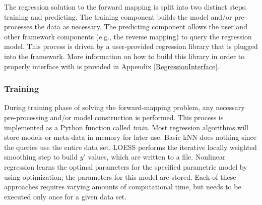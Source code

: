 The \fw regression solution to the forward mapping is split into two distinct steps: training and predicting.
The training component builds the model and/or pre-processes the data as necessary.
The predicting component allows the user and other framework components (e.g., the reverse mapping) to query the regression model.
This process is driven by a user-provided regression library that is plugged into the framework.
More information on how to build this library in order to properly interface with \fw is provided in Appendix \ref{RegressionInterface}.

\subsubsection{Training}

During training phase of solving the forward-mapping problem, any necessary pre-processing and/or model construction is performed.
This process is implemented as a Python function called \textit{train}.
Most regression algorithms will store models or meta-data in memory for later use.
Basic kNN does nothing since the queries use the entire data set.
LOESS performs the iterative locally weighted smoothing step to build $y'$ values, which are
written to a file.
Nonlinear regression learns the optimal parameters for the specified parametric model by using optimization; the parameters for this model are stored.
Each of these approaches requires varying amounts of computational time, but needs to be executed only once for a given data set.



